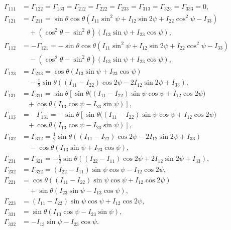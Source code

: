 \documentclass[lineno, pdflatex,sn-mathphys-ay]{sn-jnl}
\theoremstyle{thmstyleone}%
\theoremstyle{thmstyletwo}%
\theoremstyle{thmstylethree}%
\begin{document}
\begin{appendices}
\begin{align}
\Gamma_{111} &= \Gamma_{122} = \Gamma_{133} = \Gamma_{212} = \Gamma_{222}
= \Gamma_{233} = \Gamma_{313} = \Gamma_{323} = \Gamma_{333} = 0, \nonumber \\[6pt]
%
\Gamma_{121} &= \Gamma_{211} =
\sin\theta \cos\theta \left(I_{11} \sin^2\psi + I_{12} \sin 2\psi + I_{22} \cos^2\psi - I_{33}\right) \nonumber \\
&\quad + \left(\cos^2\theta - \sin^2\theta\right)(I_{13} \sin\psi + I_{23} \cos\psi), \nonumber \\[6pt]
%
\Gamma_{112} &= -\Gamma_{121} =
-\sin\theta \cos\theta \left(I_{11} \sin^2\psi + I_{12} \sin 2\psi + I_{22} \cos^2\psi - I_{33}\right) \nonumber \\
&\quad - \left(\cos^2\theta - \sin^2\theta\right)(I_{13} \sin\psi + I_{23} \cos\psi), \nonumber \\[6pt]
%
\Gamma_{123} &= \Gamma_{213} =
\cos\theta (I_{13} \sin\psi + I_{23} \cos\psi) \nonumber \\
&\quad - \tfrac12 \sin\theta \left((I_{11} - I_{22}) \cos 2\psi - 2 I_{12} \sin 2\psi + I_{33}\right), \nonumber \\[6pt]
%
\Gamma_{131} &= \Gamma_{311} =
\sin\theta \left[\sin\theta \big((I_{11} - I_{22}) \sin\psi \cos\psi + I_{12} \cos 2\psi\big) \right. \nonumber \\
&\quad \left. +\, \cos\theta (I_{13} \cos\psi - I_{23} \sin\psi)\right], \nonumber \\[6pt]
%
\Gamma_{113} &= -\Gamma_{131} =
-\sin\theta \left[\sin\theta \big((I_{11} - I_{22}) \sin\psi \cos\psi + I_{12} \cos 2\psi\big) \right. \nonumber \\
&\quad \left. +\, \cos\theta (I_{13} \cos\psi - I_{23} \sin\psi)\right], \nonumber \\[6pt]
%
\Gamma_{132} &= \Gamma_{312} =
\tfrac12 \sin\theta \left((I_{11} - I_{22}) \cos 2\psi - 2 I_{12} \sin 2\psi + I_{33}\right) \nonumber \\
&\quad - \cos\theta (I_{13} \sin\psi + I_{23} \cos\psi), \nonumber \\[6pt]
%
\Gamma_{231} &= \Gamma_{321} =
-\tfrac12 \sin\theta \left((I_{22} - I_{11}) \cos 2\psi + 2 I_{12} \sin 2\psi + I_{33}\right), \nonumber \\[6pt]
%
\Gamma_{232} &= \Gamma_{322} =
(I_{22} - I_{11}) \sin\psi \cos\psi - I_{12} \cos 2\psi, \nonumber \\[6pt]
%
\Gamma_{221} &=
\cos\theta \left((I_{11} - I_{22}) \sin\psi \cos\psi + I_{12} \cos 2\psi\right) \nonumber \\
&\quad + \sin\theta (I_{23} \sin\psi - I_{13} \cos\psi), \nonumber \\[6pt]
%
\Gamma_{223} &=
(I_{11} - I_{22}) \sin\psi \cos\psi + I_{12} \cos 2\psi, \nonumber \\[6pt]
%
\Gamma_{331} &=
\sin\theta (I_{13} \cos\psi - I_{23} \sin\psi), \nonumber \\[6pt]
%
\Gamma_{332} &=
- I_{13} \sin\psi - I_{23} \cos\psi.
\end{align}



\end{appendices}
\end{document}

